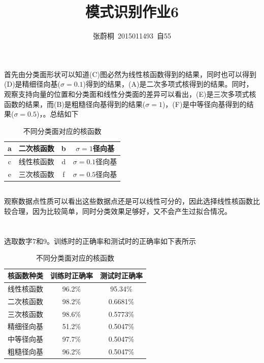 \documentclass[UTF8,a4paper]{ctexart}
\title{模式识别作业6}
\author{张蔚桐\ 2015011493\ 自55}
\begin{document}
\maketitle
\section{}
\subsection{}
首先由分类面形状可以知道(C)图必然为线性核函数得到的结果，同时也可以得到(D)是精细径向基($\sigma=0.1$)得到的结果，(A)是二次多项式核得到的结果。同时，观察支持向量的位置和分类面和线性分类面的差异可以看出，(E)是三次多项式核函数的结果，而(B)是粗糙径向基得到的结果($\sigma=1$)，(F)是中等径向基得到的结果($\sigma=0.5$)，。总结如下

\begin{table}
\caption{不同分类面对应的核函数}
\centering
\begin{tabular}{|c|c|c|c|}
\hline
a &二次核函数& b &$\sigma=1$径向基 \\
\hline
c &线性核函数& d &$\sigma=0.1$径向基\\
\hline
e &三次核函数& f &$\sigma=0.5$径向基 \\
\hline
\end{tabular}
\end{table}
\subsection{}
观察数据点性质可以看出这些数据点还是可以线性可分的，因此选择线性核函数比较合理，因为比较简单，同时分类效果足够好，又不会产生过拟合情况。
\section{}
选取数字7和9。训练时的正确率和测试时的正确率如下表所示
\begin{table}
\caption{不同分类面对应的核函数}
\centering
\begin{tabular}{|c|c|c|}
\hline
核函数种类&训练时正确率&测试时正确率\\
\hline
线性核函数&96.2\%&95.34\%\\
\hline
二次核函数&98.2\%&0.6681\%\\
\hline
三次核函数&98.6\%&0.5773\%\\
\hline
精细径向基&51.2\%&0.5047\%\\
\hline
中等径向基&97.7\%&0.5047\%\\
\hline
粗糙径向基&96.2\%&0.5047\%\\
\hline
\end{tabular}
\end{table}
\end{document}
